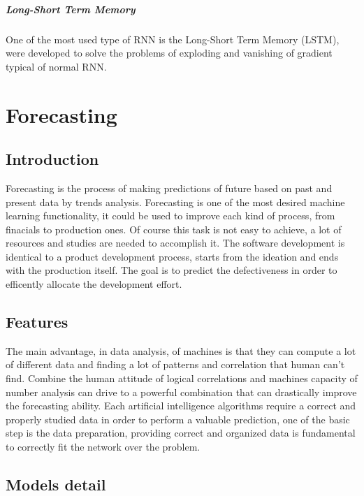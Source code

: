 \documentclass[%
    corpo=12pt,
    twoside,
    oldstyle,
    autoretitolo,
    greek,
    evenboxes,
]{toptesi}
\begin{document}
\paragraph{Long-Short Term Memory}
One of the most used type of RNN is the Long-Short Term Memory (LSTM), were developed to solve the problems of exploding and vanishing of gradient typical of normal RNN.



\chapter{Forecasting}
\label{chap:forecasting}
\section{Introduction}
Forecasting is the process of making predictions of future based on past and present data by trends analysis. Forecasting is one of the most desired machine learning functionality, it could be used to improve each kind of process, from finacials to production ones. Of course this task is not easy to achieve, a lot of resources and studies are needed to accomplish it.
The software development is identical to a product development process, starts from the ideation and ends with the production itself.
The goal is to predict the defectiveness in order to efficently allocate the development effort.

\section{Features}
The main advantage, in data analysis, of machines is that they can compute a lot of different data and finding a lot of patterns and correlation that human can't find. Combine the human attitude of logical correlations and machines capacity of number analysis can drive to a powerful combination that can drastically improve the forecasting ability.
Each artificial intelligence algorithms require a correct and properly studied data in order to perform a valuable prediction, one of the basic step is the data preparation, providing correct and organized data is fundamental to correctly fit the network over the problem.

\section{Models detail}
\end{document}
